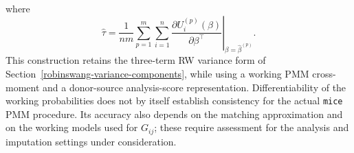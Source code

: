 where
\[
\widehat\tau=\frac{1}{nm}\sum_{p=1}^m\sum_{i=1}^n
\left.\frac{\partial U_i^{(p)}(\beta)}{\partial\beta^\top}
\right|_{\beta=\hat\beta^{(p)}}.
\]
This construction retains the three-term RW variance form of
Section~\ref{robinswang-variance-components}, while using a working
PMM cross-moment and a donor-source analysis-score representation.
Differentiability of the working probabilities does not by itself
establish consistency for the actual \texttt{mice} PMM procedure.
Its accuracy also depends on the matching approximation and on the
working models used for \(G_{ij}\); these require assessment for the
analysis and imputation settings under consideration.
